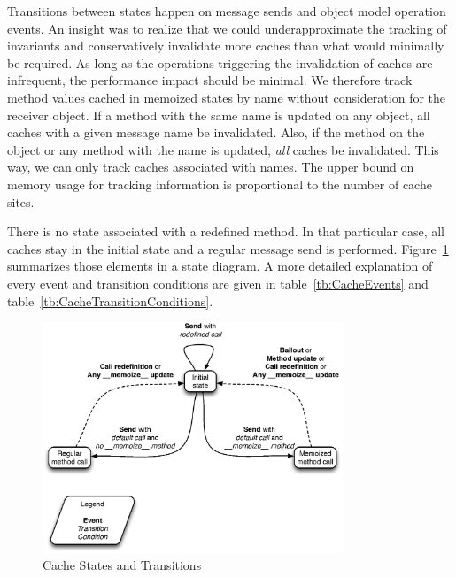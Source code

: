 Transitions between states happen on message sends and object model operation
events.  An insight was to realize that we could underapproximate the tracking
of invariants and conservatively invalidate more caches than what would
minimally be required. As long as the operations triggering the invalidation of
caches are infrequent, the performance impact should be minimal. We therefore
track method values cached in memoized states by name without consideration for
the receiver object. If a method with the same name is updated on any object,
all caches with a given message name  be invalidated. Also, if the
 method on the  object or any method with the
 name is updated, \textit{all} caches  be invalidated. This
way, we can only track caches associated with names. The upper bound on memory
usage for tracking information is proportional to the number of cache sites.

There is no state associated with a redefined  method. In that
particular case, all caches  stay in the initial state and a regular
message send is performed. Figure~\ref{fig:CacheStates}
summarizes those elements in a state diagram. A more detailed explanation of
every event and transition conditions are given in table~\ref{tb:CacheEvents}
and table~\ref{tb:CacheTransitionConditions}.

\begin{figure}[htb]
\begin{center}
\includegraphics[width=0.8\textwidth]{figures/cacheStates}
\caption{\label{fig:CacheStates} Cache States and Transitions}
\end{center}
\end{figure}

